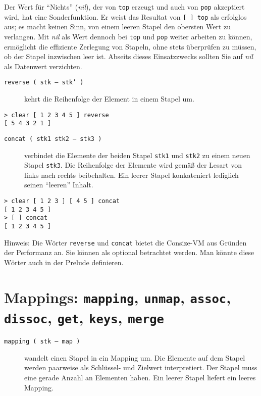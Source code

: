 Der Wert für "`Nichts"' (\emph{nil}), der von \verb|top| erzeugt und auch von \verb|pop| akzeptiert wird, hat eine Sonderfunktion. Er weist das Resultat von \verb|[ ] top| als erfolglos aus; es macht keinen Sinn, von einem leeren Stapel den obersten Wert zu verlangen. Mit \emph{nil} als Wert dennoch bei \verb|top| und \verb|pop| weiter arbeiten zu können, ermöglicht die effiziente Zerlegung von Stapeln, ohne stets überprüfen zu müssen, ob der Stapel inzwischen leer ist. Abseits dieses Einsatzzwecks sollten Sie auf \emph{nil} als Datenwert verzichten.

\begin{description}
\item[\texttt{reverse ( stk -- stk' )}] kehrt die Reihenfolge der Element in einem Stapel um.
\end{description}

\begin{verbatim}
> clear [ 1 2 3 4 5 ] reverse
[ 5 4 3 2 1 ]
\end{verbatim}

\begin{description}
\item[\texttt{concat ( stk1 stk2 -- stk3 )}] verbindet die Elemente der beiden Stapel \verb|stk1| und \verb|stk2| zu einem neuen Stapel \verb|stk3|. Die Reihenfolge der Elemente wird gemäß der Lesart von links nach rechts beibehalten. Ein leerer Stapel konkateniert lediglich seinen "`leeren"' Inhalt.
\end{description}

\begin{verbatim}
> clear [ 1 2 3 ] [ 4 5 ] concat
[ 1 2 3 4 5 ]
> [ ] concat
[ 1 2 3 4 5 ]
\end{verbatim}

Hinweis: Die Wörter \verb|reverse| und \verb|concat| bietet die Consize-VM aus Gründen der Performanz an. Sie können als optional betrachtet werden. Man könnte diese Wörter auch in der Prelude definieren.


\section{Mappings: \texttt{mapping}, \texttt{unmap}, \texttt{assoc}, \texttt{dissoc}, \texttt{get}, \texttt{keys}, \texttt{merge}}

\begin{description}
\item[\texttt{mapping ( stk -- map )}] wandelt einen Stapel in ein Mapping um. Die Elemente auf dem Stapel werden paarweise als Schlüssel- und Zielwert interpretiert. Der Stapel muss eine gerade Anzahl an Elementen haben. Ein leerer Stapel liefert ein leeres Mapping.
\end{description}

